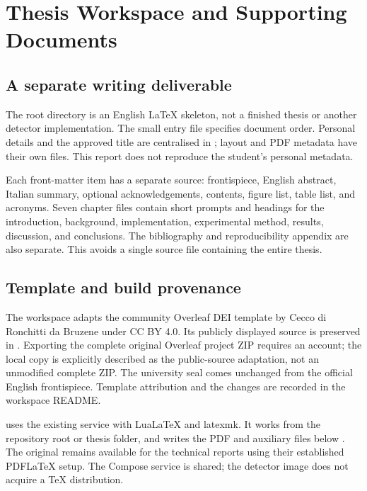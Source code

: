 \section{Thesis Workspace and Supporting Documents}
\label{sec:thesis-workspace}

\subsection{A separate writing deliverable}

The root  directory is an English LaTeX skeleton, not a finished
thesis or another detector implementation. The small  entry
file specifies document order. Personal details and the approved title are
centralised in ; layout and PDF metadata have their own
files. This report does not reproduce the student's personal metadata.

Each front-matter item has a separate source: frontispiece, English abstract,
Italian summary, optional acknowledgements, contents, figure list, table list,
and acronyms. Seven chapter files contain short prompts and headings for the
introduction, background, implementation, experimental method, results,
discussion, and conclusions. The bibliography and reproducibility appendix are
also separate. This avoids a single source file containing the entire thesis.

\subsection{Template and build provenance}

The workspace adapts the community Overleaf DEI template by
Cecco di Ronchitti da Bruzene under CC BY 4.0. Its publicly displayed source is
preserved in . Exporting the complete original
Overleaf project ZIP requires an account; the local copy is explicitly
described as the public-source adaptation, not an unmodified complete ZIP.
The university seal comes unchanged from the official English frontispiece.
Template attribution and the changes are recorded in the workspace README.

 uses the existing  service
with LuaLaTeX and latexmk. It works from the repository root or thesis folder,
and writes the PDF and auxiliary files below .
The original  remains available for the technical
reports using their established PDFLaTeX setup. The Compose service is shared;
the detector image does not acquire a TeX distribution.

